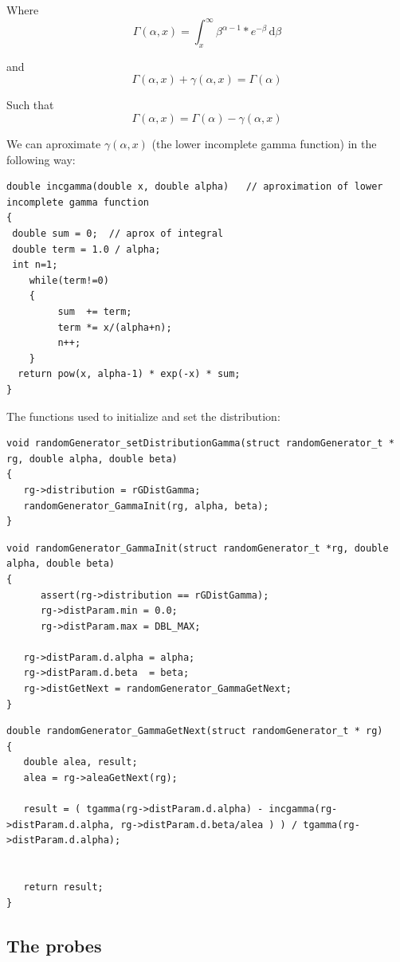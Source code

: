    Where $$\Gamma(\alpha, x) = \int_x^\infty \! \beta^{\alpha-1}*e^{-\beta}\, \mathrm{d}\beta $$

   and $$\Gamma(\alpha, x) + \gamma(\alpha, x) = \Gamma(\alpha) $$

   Such that $$ \Gamma(\alpha, x) = \Gamma(\alpha) - \gamma(\alpha, x) $$

 We can aproximate $\gamma(\alpha, x)$ (the lower incomplete gamma function) in the following way:
\begin{verbatim}
double incgamma(double x, double alpha)   // aproximation of lower incomplete gamma function
{
 double sum = 0;  // aprox of integral
 double term = 1.0 / alpha;
 int n=1; 
    while(term!=0)
    {
         sum  += term;
         term *= x/(alpha+n);
         n++;
    }
  return pow(x, alpha-1) * exp(-x) * sum;
}
\end{verbatim}

The functions used to initialize and set the distribution:
\begin{verbatim}
void randomGenerator_setDistributionGamma(struct randomGenerator_t * rg, double alpha, double beta)
{
   rg->distribution = rGDistGamma;
   randomGenerator_GammaInit(rg, alpha, beta);
} 
\end{verbatim}


\begin{verbatim}
void randomGenerator_GammaInit(struct randomGenerator_t *rg, double alpha, double beta)
{
      assert(rg->distribution == rGDistGamma);   
      rg->distParam.min = 0.0;
      rg->distParam.max = DBL_MAX;
  
   rg->distParam.d.alpha = alpha;
   rg->distParam.d.beta  = beta; 
   rg->distGetNext = randomGenerator_GammaGetNext;
}
\end{verbatim}

\begin{verbatim}
double randomGenerator_GammaGetNext(struct randomGenerator_t * rg)
{
   double alea, result;
   alea = rg->aleaGetNext(rg);

   result = ( tgamma(rg->distParam.d.alpha) - incgamma(rg->distParam.d.alpha, rg->distParam.d.beta/alea ) ) / tgamma(rg->distParam.d.alpha); 
  
  
   return result;
}
\end{verbatim}

%
\subsection{The probes}

